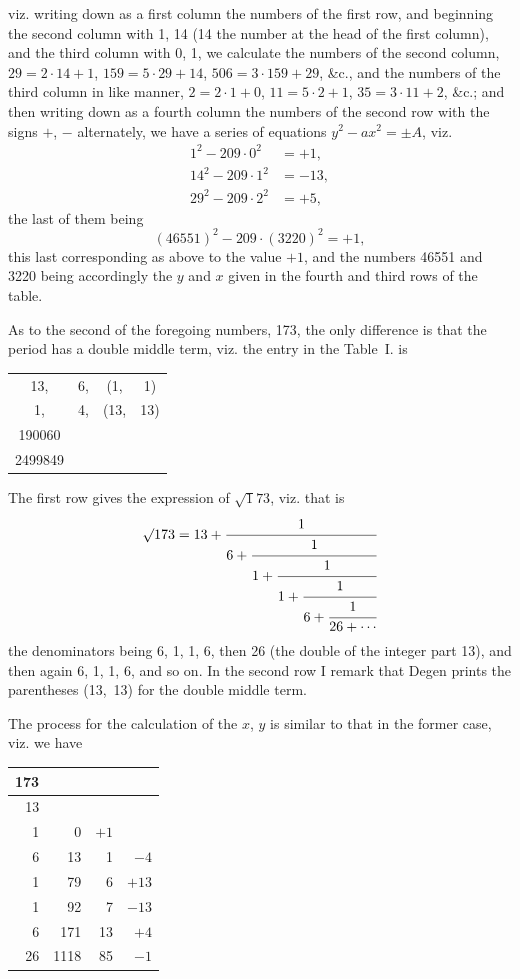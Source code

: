\documentclass[12pt,a4paper]{article}
\begin{document}
viz. writing down as a first column the numbers of the first row, and beginning the second column with 1, 14 (14 the number at the head of the first column), and the third column with 0, 1, we calculate the numbers of the second column, $29 = 2 \cdot 14 + 1$, $159 = 5 \cdot 29 + 14$, $506 = 3 \cdot 159 + 29$, \&c., and the numbers of the third column in like manner, $2 = 2 \cdot 1 + 0$, $11 = 5 \cdot 2 + 1$, $35 = 3 \cdot 11 + 2$, \&c.; and then writing down as a fourth column the numbers of the second row with the signs $+$, $-$ alternately, we have a series of equations $y^{2} - ax^{2} = \pm A$, viz.
\[
\begin{aligned}
1^{2} - 209 \cdot 0^{2} &= +1, \\
14^{2} - 209 \cdot 1^{2} &= -13, \\
29^{2} - 209 \cdot 2^{2} &= +5,
\end{aligned}
\]
the last of them being
\[ (46551)^{2} - 209 \cdot (3220)^{2} = +1, \]
this last corresponding as above to the value $+1$, and the numbers 46551 and 3220 being accordingly the $y$ and $x$ given in the fourth and third rows of the table.


\newpage
As to the second of the foregoing numbers, 173, the only difference is that the period has a double middle term, viz. the entry in the Table~I. is
\begin{center}
\begin{tabular}{cccc}
13, & 6, & (\phantom{1}1, & \phantom{1}1) \\
1, & 4, & (13, & 13) \\
190060 & & & \\
2499849 & & &
\end{tabular}
\end{center}
The first row gives the expression of $\surd 173$, viz. that is
\[
\surd 173 = 13 +
\cfrac{1}{6+
 \cfrac{1}{1+
  \cfrac{1}{1+
   \cfrac{1}{6+
    \cfrac{1}{26+\cdots}}}}
}
\]
the denominators being 6, 1, 1, 6, then 26 (the double of the integer part 13), and then again 6, 1, 1, 6, and so on. In the second row I remark that Degen prints the parentheses (13,~13) for the double middle term.

The process for the calculation of the $x$, $y$ is similar to that in the former case, viz. we have

\begin{center}
\begin{tabular}{r|r|r|r}
173 & & & \\ \hline
13 & & & \\
1 & 0 & $+1$ & \\
6 & 13 & 1 & $-4$ \\
1 & 79 & 6 & $+13$ \\
1 & 92 & 7 & $-13$ \\
6 & 171 & 13 & $+4$ \\
26 & 1118 & 85 & $-1$
\end{tabular}
\end{center}
\end{document}
